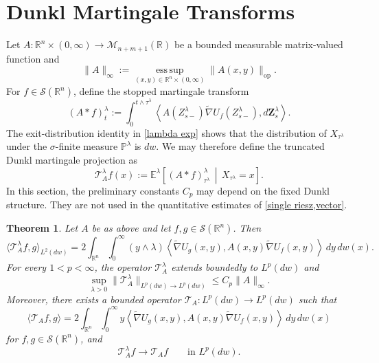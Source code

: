 \documentclass[11pt]{amsart}
\newtheorem{theorem}{Theorem}[section]
\theoremstyle{definition}
\theoremstyle{remark}
\numberwithin{equation}{section}
\newcommand{\R}{\mathbb{R}}
\begin{document}
\section{Dunkl Martingale Transforms}
\label{sect 4}
Let
$A:\R^n\times(0,\infty)\longrightarrow\mathcal M_{n+m+1}(\R)$
be a bounded measurable matrix-valued function and
\[
\|A\|_\infty
:=
\operatorname*{ess\,sup}_{(x,y)\in\R^n\times(0,\infty)}
\|A(x,y)\|_{\mathrm{op}}.
\]
For $f\in\mathcal S(\R^n)$, define the stopped martingale transform
\begin{equation}
(A\ast f)_t^\lambda
:=
\int_0^{t\wedge\tau^\lambda}
\left\langle
A(Z_{s-}^\lambda)\widetilde\nabla U_f(Z_{s-}^\lambda),
d\mathbf Z_s^\lambda
\right\rangle.
\end{equation}
The exit-distribution identity in \cref{lambda exp} shows that the distribution of $X_{\tau^\lambda}$ under the $\sigma$-finite measure $\mathbb P^\lambda$ is $dw$. We may therefore define the truncated Dunkl martingale projection as
\begin{equation}
\mathcal T_A^\lambda f(x)
:=
\mathbb E^\lambda\left[
(A\ast f)_{\tau^\lambda}^\lambda
\,\middle|\,
X_{\tau^\lambda}=x
\right].
\label{eq:truncated-dunkl-projection}
\end{equation}
In this section, the preliminary constants $C_p$ may depend on the fixed Dunkl structure. They are not used in the quantitative estimates of \cref{single riesz,vector}.

\begin{theorem}
\label{thm:dunkl-martingale-projection}
Let $A$ be as above and let $f,g\in\mathcal S(\R^n)$. Then
\begin{equation}
\langle\mathcal T_A^\lambda f,g\rangle_{L^2(dw)}
=
2\int_{\R^n}\int_0^\infty
(y\wedge\lambda)
\left\langle\widetilde\nabla U_g(x,y),
A(x,y)\widetilde\nabla U_f(x,y)\right\rangle
\,dy\,dw(x).
\label{eq:bilinear_predictable}
\end{equation}
For every $1<p<\infty$, the operator $\mathcal T_A^\lambda$ extends boundedly to $L^p(dw)$ and
\[
\sup_{\lambda>0}
\|\mathcal T_A^\lambda\|_{L^p(dw)\to L^p(dw)}
\leq C_p\|A\|_\infty.
\]
Moreover, there exists a bounded operator $\mathcal T_A:L^p(dw)\to L^p(dw)$ such that
\begin{equation}
\langle\mathcal T_Af,g\rangle
=
2\int_{\R^n}\int_0^\infty
 y\left\langle\widetilde\nabla U_g(x,y),
A(x,y)\widetilde\nabla U_f(x,y)\right\rangle
\,dy\,dw(x)
\label{eq:limit-TA-bilinear-form}
\end{equation}
for $f,g\in\mathcal S(\R^n)$, and
\[
\mathcal T_A^\lambda f\longrightarrow\mathcal T_Af
\qquad\text{in }L^p(dw).
\]
\end{theorem}
\end{document}
